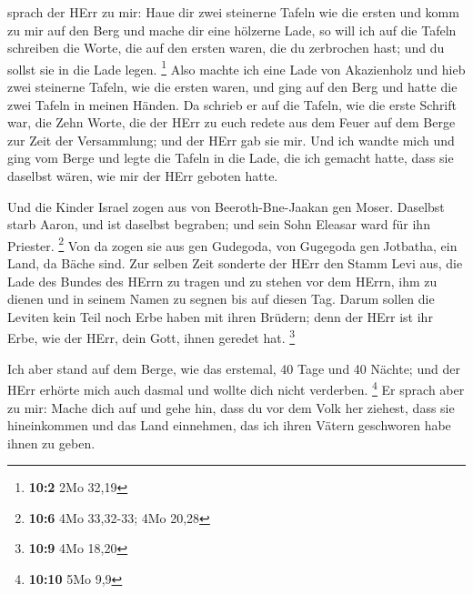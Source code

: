 sprach der HErr zu mir: Haue dir zwei steinerne Tafeln wie die ersten
und komm zu mir auf den Berg und mache dir eine hölzerne Lade,
 so will ich auf die Tafeln schreiben die Worte, die auf den
ersten waren, die du zerbrochen hast; und du sollst sie in die Lade
legen. \footnote{\textbf{10:2} 2Mo 32,19}  Also machte ich
eine Lade von Akazienholz und hieb zwei steinerne Tafeln, wie die ersten
waren, und ging auf den Berg und hatte die zwei Tafeln in meinen Händen.
 Da schrieb er auf die Tafeln, wie die erste Schrift war,
die Zehn Worte, die der HErr zu euch redete aus dem Feuer auf dem Berge
zur Zeit der Versammlung; und der HErr gab sie mir.  Und ich
wandte mich und ging vom Berge und legte die Tafeln in die Lade, die ich
gemacht hatte, dass sie daselbst wären, wie mir der HErr geboten hatte.

 Und die Kinder Israel zogen aus von Beeroth-Bne-Jaakan gen
Moser. Daselbst starb Aaron, und ist daselbst begraben; und sein Sohn
Eleasar ward für ihn Priester. \footnote{\textbf{10:6} 4Mo 33,32-33; 4Mo
  20,28}  Von da zogen sie aus gen Gudegoda, von Gugegoda
gen Jotbatha, ein Land, da Bäche sind.  Zur selben Zeit
sonderte der HErr den Stamm Levi aus, die Lade des Bundes des HErrn zu
tragen und zu stehen vor dem HErrn, ihm zu dienen und in seinem Namen zu
segnen bis auf diesen Tag.  Darum sollen die Leviten kein
Teil noch Erbe haben mit ihren Brüdern; denn der HErr ist ihr Erbe, wie
der HErr, dein Gott, ihnen geredet hat. \footnote{\textbf{10:9} 4Mo
  18,20}

 Ich aber stand auf dem Berge, wie das erstemal, 40 Tage
und 40 Nächte; und der HErr erhörte mich auch dasmal und wollte dich
nicht verderben. \footnote{\textbf{10:10} 5Mo 9,9}  Er
sprach aber zu mir: Mache dich auf und gehe hin, dass du vor dem Volk
her ziehest, dass sie hineinkommen und das Land einnehmen, das ich ihren
Vätern geschworen habe ihnen zu geben.


